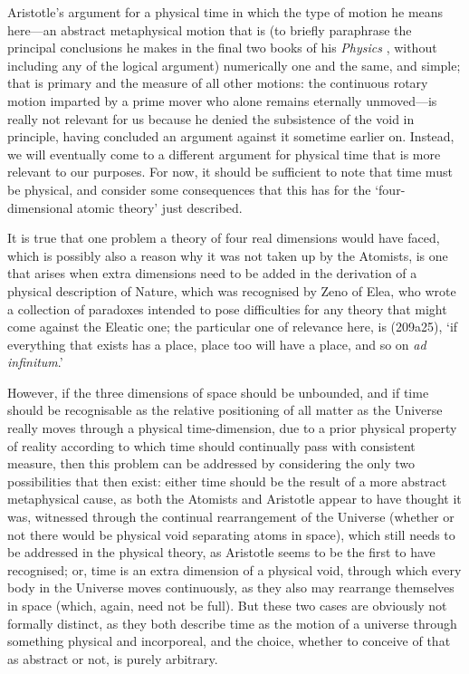 Aristotle's argument for a physical time in which the type of motion he means here---an abstract metaphysical motion that is (to briefly paraphrase the principal conclusions he makes in the final two books of his \textit{Physics} \cite{Aristotle1984}, without including any of the logical argument) numerically one and the same, and simple; that is primary and the measure of all other motions: the continuous rotary motion imparted by a prime mover who alone remains eternally unmoved---is really not relevant for us because he denied the subsistence of the void in principle, having concluded an argument against it sometime earlier on. Instead, we will eventually come to a different argument for physical time that is more relevant to our purposes. For now, it should be sufficient to note that time must be physical, and consider some consequences that this has for the `four-dimensional atomic theory' just described.

It is true that one problem a theory of four real dimensions would have faced, which is possibly also a reason why it was not taken up by the Atomists, is one that arises when extra dimensions need to be added in the derivation of a physical description of Nature, which was recognised by Zeno of Elea, who wrote a collection of paradoxes intended to pose difficulties for any theory that might come against the Eleatic one; the particular one of relevance here, is \cite{Aristotle1984} (209a25), `if everything that exists has a place, place too will have a place, and so on \textit{ad infinitum}.'

However, if the three dimensions of space should be unbounded, and if time should be recognisable as the relative positioning of all matter as the Universe really moves through a physical time-dimension, due to a prior physical property of reality according to which time should continually pass with consistent measure, then this problem can be addressed by considering the only two possibilities that then exist: either time should be the result of a more abstract metaphysical cause, as both the Atomists and Aristotle appear to have thought it was, witnessed through the continual rearrangement of the Universe (whether or not there would be physical void separating atoms in space), which still needs to be addressed in the physical theory, as Aristotle seems to be the first to have recognised; or, time is an extra dimension of a physical void, through which every body in the Universe moves continuously, as they also may rearrange themselves in space (which, again, need not be full). But these two cases are obviously not formally distinct, as they both describe time as the motion of a universe through something physical and incorporeal, and the choice, whether to conceive of that as abstract or not, is purely arbitrary.

